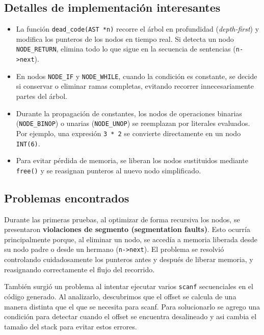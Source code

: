 \documentclass[12pt,a4paper]{article}
\begin{document}
\subsection{Detalles de implementación interesantes}
\begin{itemize}
    \item La función \texttt{dead\_code(AST *n)} recorre el árbol en profundidad (\textit{depth-first}) y modifica los punteros de los nodos en tiempo real.  
    Si detecta un nodo \texttt{NODE\_RETURN}, elimina todo lo que sigue en la secuencia de sentencias (\texttt{n->next}).
    \item En nodos \texttt{NODE\_IF} y \texttt{NODE\_WHILE}, cuando la condición es constante, se decide si conservar o eliminar ramas completas, evitando recorrer innecesariamente partes del árbol.
    \item Durante la propagación de constantes, los nodos de operaciones binarias (\texttt{NODE\_BINOP}) o unarias (\texttt{NODE\_UNOP}) se reemplazan por literales evaluados. Por ejemplo, una expresión \texttt{3 * 2} se convierte directamente en un nodo \texttt{INT(6)}.
    \item Para evitar pérdida de memoria, se liberan los nodos sustituidos mediante \texttt{free()} y se reasignan punteros al nuevo nodo simplificado.
\end{itemize}

\subsection{Problemas encontrados}
Durante las primeras pruebas, al optimizar de forma recursiva los nodos, se presentaron \textbf{violaciones de segmento (segmentation faults)}.  
Esto ocurría principalmente porque, al eliminar un nodo, se accedía a memoria liberada desde su nodo padre o desde un hermano (\texttt{n->next}).  
El problema se resolvió controlando cuidadosamente los punteros antes y después de liberar memoria, y reasignando correctamente el flujo del recorrido.

También surgió un problema al intentar ejecutar varios \texttt{scanf} secuenciales en el código generado. Al analizarlo, descubrimos que el offset se calcula de una manera distinta que el que se necesita para scanf. Para solucionarlo se agrego una condición para detectar cuando el offset se encuentra desalineado y asi cambia el tamaño del stack para evitar estos errores.
\end{document}
